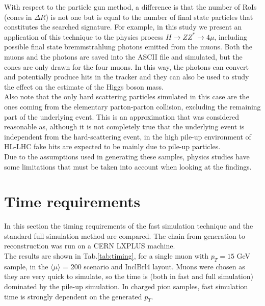 \documentclass[a4paper,twoside,12pt]{book}
\begin{document}
With respect to the particle gun method, a difference is that the number of RoIs (cones in
$\Delta R$) is not one but is equal to the number of final state particles that constitutes the
searched signature. For example,
in this study we present an application of this technique to the physics process
$H \rightarrow ZZ^* \rightarrow 4\mu$, including possible final state bremmstrahlung photons emitted from the muons. Both the muons and the photons are saved into the 
ASCII file and simulated, but the cones are only drawn for the four muons. In this way, the photons can convert and potentially produce hits in the
tracker and they can also be used to study the effect on the estimate of the Higgs boson mass.\\

Also note that the only hard scattering particles simulated in this case are the ones coming from
the elementary parton-parton collision, excluding the remaining part of the underlying event. This
is an approximation that was considered reasonable as, although it is not completely
true that the underlying event is independent from the hard-scattering event, in the high pile-up
environment of HL-LHC fake hits are expected to be mainly due to pile-up particles. \\

Due to the assumptions used in generating these samples, physics studies have some limitations that must be taken into
account when looking at the findings.

\section{Time requirements}

In this section the timing requirements of the fast simulation technique and the
standard full simulation method are compared.
The chain from generation to reconstruction was run on a 
CERN LXPLUS machine. \\

The results are shown in Tab.\ref{tab:timing}, for a single muon with $p_{T} = 15$ GeV sample,
in the $\langle\mu\rangle$ = 200 scenario and InclBrl4 layout. Muons were chosen as 
they are very quick to simulate, so the time is (both in fast and full simulation) 
dominated by the pile-up simulation. In charged pion samples, fast simulation time is strongly 
dependent on the generated $p_{T}$.
\end{document}
